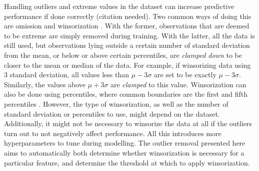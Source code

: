 \documentclass{statsmsc}
\begin{document}
Handling outliers and extreme values in the dataset can increase predictive performance if done
correctly (citation needed). Two common ways of doing this are omission and winsorization
\citep{winsorization}. With the former, observations that are deemed to be extreme are simply
removed during training. With the latter, all the data is still used, but observations lying
outside a certain number of standard deviation from the mean, or below or above certain
percentiles, are \textit{clamped down} to be closer to the mean or median of the data.
For example, if winsorizing data using 3 standard deviation, all values less than
$\mu-3\sigma$ are set to be exactly $\mu-3\sigma$. Similarly, the values above
$\mu+3\sigma$ are \textit{clamped} to this value. Winsorization can also be done using percentiles,
where common boundaries are the first and fifth percentiles \cite{winsorization}.
However, the type of winsorization, as well as the number of standard deviation
or percentiles to use, might depend on the dataset. Additionally, it might not
be necessary to winsorize the data at all if the outliers turn out to not
negatively affect performance. All this introduces more hyperparameters to tune
during modelling. The outlier removal presented here aims to automatically both determine
whether winsorization is necessary for a particular feature, and determine the threshold at
which to apply winsorization.
\end{document}
